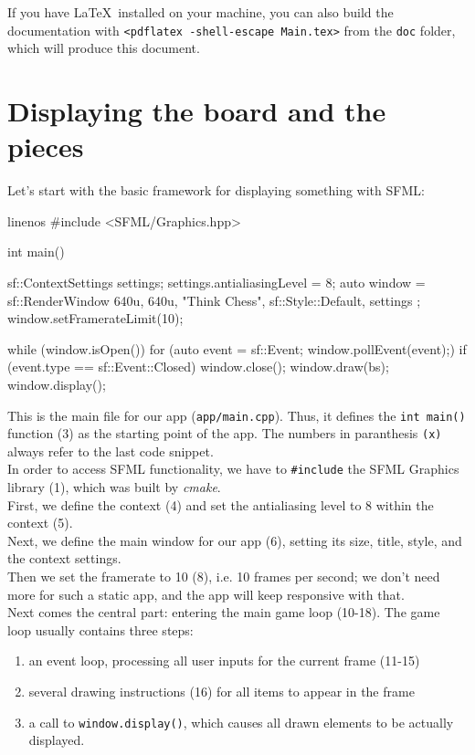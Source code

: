 If you have \LaTeX\ installed on your machine, you can also build the documentation
with \texttt{<pdflatex -shell-escape Main.tex>} from the \texttt{doc} folder,
which will produce this document.

\section{Displaying the board and the pieces}

Let's start with the basic framework for displaying something with SFML:

\begin{cpp*}{linenos}
#include <SFML/Graphics.hpp>

int main() {
  sf::ContextSettings settings;
  settings.antialiasingLevel = 8;
  auto window = sf::RenderWindow{ {640u, 640u}, "Think Chess",
              sf::Style::Default, settings };
  window.setFramerateLimit(10);

  while (window.isOpen()) {
    for (auto event = sf::Event{}; window.pollEvent(event);) {
      if (event.type == sf::Event::Closed) {
        window.close();
      }
    }
    window.draw(bs);
    window.display();
  }
}
\end{cpp*}

This is the main file for our app (\texttt{app/main.cpp}).
Thus, it defines the \texttt{int main()} function (3) as the starting point of the app.
The numbers in paranthesis \texttt{(x)} always refer to the last code snippet.\\
In order to access SFML functionality, we have to \texttt{#include} the SFML Graphics
library (1), which was built by \emph{cmake}.\\
First, we define the context (4) and set the antialiasing level to 8 within the context (5).\\
Next, we define the main window for our app (6), setting its size, title, style, and the context
settings.\\
Then we set the framerate to 10 (8), i.e. 10 frames per second; we don't need more
for such a static app, and the app will keep responsive with that.\\
Next comes the central part: entering the main game loop (10-18). The game loop usually contains
three steps:

\begin{enumerate}
  \item an event loop, processing all user inputs for the current frame (11-15)
  \item several drawing instructions (16) for all items to appear in the frame
  \item a call to \texttt{window.display()}, which causes all drawn elements to be
    actually displayed.
\end{enumerate}

